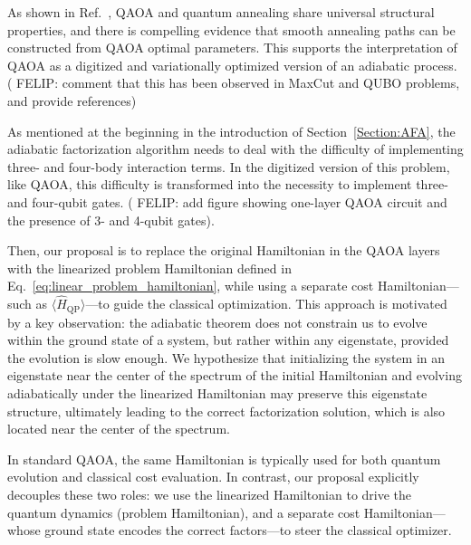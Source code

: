 As shown in Ref.~\cite{diez-valle_universal_2025}, QAOA and quantum annealing share universal
structural properties, and there is compelling evidence that smooth annealing paths can be constructed
from QAOA optimal parameters. This supports the interpretation of QAOA as a digitized
and variationally optimized version of an adiabatic process. ({\color{red} FELIP: comment that this has been observed
in MaxCut and QUBO problems, and provide references})

As mentioned at the beginning in the introduction of Section~\ref{Section:AFA}, the adiabatic factorization algorithm needs to deal with the difficulty of implementing three- and four-body interaction terms. In the digitized version of this problem, like QAOA, this difficulty is transformed into the necessity to implement three- and four-qubit gates. ({\color{red} FELIP: add figure showing one-layer QAOA circuit and the presence of 3- and 4-qubit gates}).

Then, our proposal is to replace the original Hamiltonian in the QAOA layers with the linearized problem Hamiltonian defined in Eq.~\ref{eq:linear_problem_hamiltonian}, while using a separate cost Hamiltonian—such as $\langle \hat{H}_\mathrm{QP} \rangle$—to guide the classical optimization. This approach is motivated by a key observation: the adiabatic theorem does not constrain us to evolve within the ground state of a system, but rather within any eigenstate, provided the evolution is slow enough. We hypothesize that initializing the system in an eigenstate near the center of the spectrum of the initial Hamiltonian and evolving adiabatically under the linearized Hamiltonian may preserve this eigenstate structure, ultimately leading to the correct factorization solution, which is also located near the center of the spectrum.

In standard QAOA, the same Hamiltonian is typically used for both quantum evolution and classical cost evaluation. In contrast, our proposal explicitly decouples these two roles: we use the linearized Hamiltonian to drive the quantum dynamics (problem Hamiltonian), and a separate cost Hamiltonian—whose ground state encodes the correct factors—to steer the classical optimizer.
